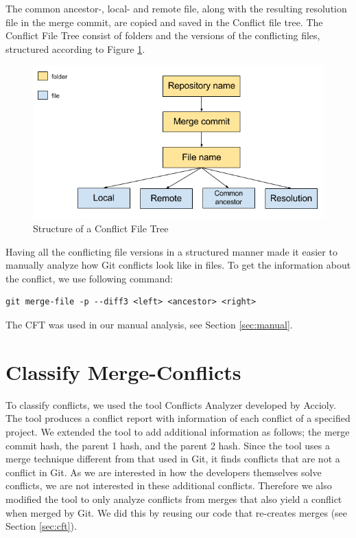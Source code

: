 The common ancestor-, local- and remote file, along with the resulting resolution file in the merge commit, are copied and saved in the Conflict file tree. The Conflict File Tree consist of folders and the versions of the conflicting files, structured according to Figure \ref{fig:cft}.\\
\begin{figure}[H]
\centering
\includegraphics[width=400pt]{figure/conflicts.png}
\caption{Structure of a Conflict File Tree}\label{fig:cft}
\end{figure}

Having all the conflicting file versions in a structured manner made it easier to manually analyze how Git conflicts look like in files. To get the information about the conflict, we use following command:
\lstset{language=Bash,numbers=left,xleftmargin=2em,frame=single,framexleftmargin=1.5em}
\begin{lstlisting}[frame=single,breaklines=true,tabsize=2]
git merge-file -p --diff3 <left> <ancestor> <right>
\end{lstlisting}
The CFT was used in our manual analysis, see Section \ref{sec:manual}.
\section{Classify Merge-Conflicts}
To classify conflicts, we used the tool Conflicts Analyzer developed by Accioly. The tool produces a conflict report with information of each conflict of a specified project. We extended the tool to add additional information as follows; the merge commit hash, the parent 1 hash, and the parent 2 hash. Since the tool uses a merge technique different from that used in Git, it finds conflicts that are not a conflict in Git. As we are interested in how the developers themselves solve conflicts, we are not interested in these additional conflicts. Therefore we also modified the tool to only analyze conflicts from merges that also yield a conflict when merged by Git. We did this by reusing our code that re-creates merges (see Section \ref{sec:cft}).

